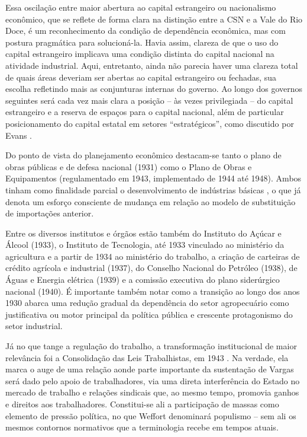 Essa oscilação entre maior abertura ao capital estrangeiro ou
nacionalismo econômico, que se reflete de forma clara na distinção entre
a CSN e a Vale do Rio Doce, é um reconhecimento da
condição de dependência econômica, mas com postura pragmática para
solucioná-la. Havia assim, clareza de que o uso do capital estrangeiro implicava
uma condição distinta do capital nacional na atividade industrial. Aqui,
entretanto, ainda não parecia haver uma clareza total de quais áreas
deveriam ser abertas ao capital estrangeiro ou fechadas, sua escolha
refletindo mais as conjunturas internas do governo. Ao longo dos
governos seguintes será cada vez mais clara a posição -- às vezes
privilegiada -- do capital estrangeiro e a reserva de espaços para o
capital nacional, além de particular posicionamento do capital estatal
em setores ``estratégicos'', como discutido por Evans \citeyearpar{evans_dependent_1979}.

Do ponto de vista do planejamento econômico destacam-se tanto o plano de
obras públicas e de defesa nacional (1931) como o Plano de Obras e
Equipamentos (regulamentado em 1943, implementado de 1944 até 1948).
Ambos tinham como finalidade parcial o
desenvolvimento de indústrias básicas \citep{canocintra1974}, o que já
denota um esforço consciente de mudança em relação ao modelo de
substituição de importações anterior.

Entre os diversos institutos e órgãos estão também do Instituto do
Açúcar e Álcool (1933), o Instituto de Tecnologia, até 1933 vinculado ao
ministério da agricultura e a partir de 1934 ao ministério do trabalho,
a criação de carteiras de crédito agrícola e industrial (1937), do
Conselho Nacional do Petróleo (1938), de Águas e Energia elétrica (1939)
e a comissão executiva do plano siderúrgico nacional (1940). É
importante também notar como a transição ao longo dos anos 1930 abarca
uma redução gradual da dependência do setor agropecuário como
justificativa ou motor principal da política pública e crescente
protagonismo do setor industrial.

Já no que tange a regulação do trabalho, a transformação institucional de maior relevância foi a
Consolidação das Leis Trabalhistas, em 1943 \citep{feijo_industrializacao_2023}. Na verdade,
ela marca o auge de uma relação aonde parte importante da sustentação de
Vargas será dado pelo apoio de trabalhadores, via uma direta interferência do
Estado no mercado de trabalho e relações sindicais que, ao mesmo tempo,
promovia ganhos e direitos aos trabalhadores. Constitui-se ali a participação de massas
como elemento de pressão política, no que Weffort \citeyearpar{weffortPopulismoNaPolitica2003}
denominará populismo -- sem ali os mesmos contornos normativos que a terminologia recebe
em tempos atuais.

